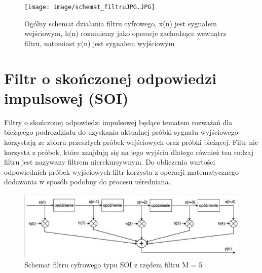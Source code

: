\documentclass[eng, pl, oneside, openright, final, openbib]{mgr}\DeclareUnicodeCharacter{0301}{\'{e}}
\newtheorem{twr}{Twierdzenie}
\begin{document}
\begin{figure}[ht]
\centering
\texttt{[image: image/schemat\_filtruJPG.JPG]}
\caption{Ogólny schemat działania filtru cyfrowego, x(n) jest sygnałem wejściowym, h(n) rozumiemy jako operacje zachodzące wewnątrz filtru, natomiast y(n) jest sygnałem wyjściowym}
\end{figure}




\section{Filtr o skończonej odpowiedzi impulsowej (SOI)}

Filtry o skończonej odpowiedzi impulsowej będące tematem rozważań dla bieżącego podrozdziału do uzyskania aktualnej próbki sygnału wyjściowego korzystają ze zbioru przeszłych próbek wejściowych oraz próbki bieżącej. Filtr nie korzysta z próbek, które znajdują się na jego wyjściu dlatego również ten rodzaj filtru jest nazywany filtrem nierekursywnym. Do obliczenia wartości odpowiednich próbek wyjściowych filtr korzysta z operacji matematycznego dodawania w sposób podobny do procesu uśredniana.
 
\begin{figure}[h]
	\includegraphics[scale=1.1]{image/fir.png}
	\caption{Schemat filtru cyfrowego typu SOI z rzędem filtru M = 5}
\end{figure}
\end{document}
